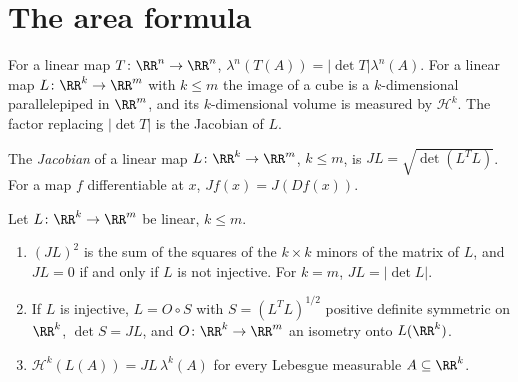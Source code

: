 \section{The area formula}\label{geometric-measure-theory:section-area-formula}

For a linear map $T \colon \RR^n \to \RR^n$, $\lambda^n(T(A)) = |\det T|\lambda^n(A)$. For a linear map $L \colon \RR^k \to \RR^m$ with $k \leq m$ the image of a cube is a
$k$-dimensional parallelepiped in $\RR^m$, and its $k$-dimensional volume is measured by $\mathcal{H}^k$. The factor replacing $|\det T|$ is the Jacobian of $L$.

\begin{definition}\label{geometric-measure-theory:definition-jacobian}
The \emph{Jacobian} of a linear map $L \colon \RR^k \to \RR^m$, $k \leq m$, is $JL = \sqrt{\det(L^TL)}$. For a map $f$ differentiable at $x$, $Jf(x) = J(Df(x))$.
\end{definition}

\begin{lemma}\label{geometric-measure-theory:lemma-jacobian}
Let $L \colon \RR^k \to \RR^m$ be linear, $k \leq m$.
\begin{enumerate}
\item $(JL)^2$ is the sum of the squares of the $k \times k$ minors of the matrix of $L$, and $JL = 0$ if and only if $L$ is not injective. For $k = m$, $JL = |\det L|$.
\item If $L$ is injective, $L = O \circ S$ with $S = (L^TL)^{1/2}$ positive definite symmetric on $\RR^k$, $\det S = JL$, and $O \colon \RR^k \to \RR^m$ an isometry onto $L(\RR^k)$.
\item $\mathcal{H}^k(L(A)) = JL\,\lambda^k(A)$ for every Lebesgue measurable $A \subseteq \RR^k$.
\end{enumerate}
\end{lemma}

